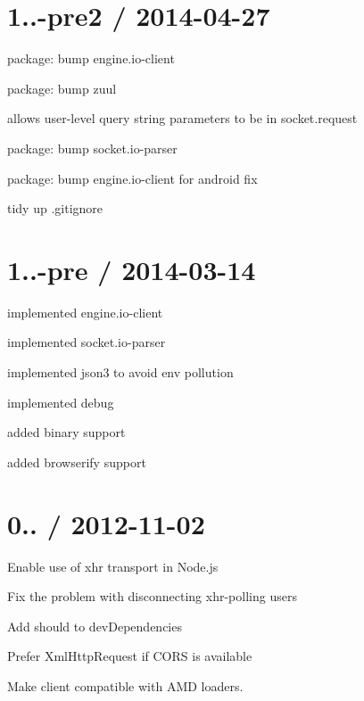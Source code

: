 \section*{1..-\/pre2 / 2014-\/04-\/27 }


\begin{DoxyItemize}
\item package\+: bump {\ttfamily engine.\+io-\/client}
\item package\+: bump {\ttfamily zuul}
\item allows user-\/level query string parameters to be in socket.\+request
\item package\+: bump {\ttfamily socket.\+io-\/parser}
\item package\+: bump {\ttfamily engine.\+io-\/client} for android fix
\item tidy up .gitignore
\end{DoxyItemize}

\section*{1..-\/pre / 2014-\/03-\/14 }


\begin{DoxyItemize}
\item implemented {\ttfamily engine.\+io-\/client}
\item implemented {\ttfamily socket.\+io-\/parser}
\item implemented {\ttfamily json3} to avoid env pollution
\item implemented {\ttfamily debug}
\item added binary support
\item added {\ttfamily browserify} support
\end{DoxyItemize}

\section*{0.. / 2012-\/11-\/02 }


\begin{DoxyItemize}
\item Enable use of \textquotesingle{}xhr\textquotesingle{} transport in Node.\+js
\item Fix the problem with disconnecting xhr-\/polling users
\item Add should to dev\+Dependencies
\item Prefer Xml\+Http\+Request if C\+O\+RS is available
\item Make client compatible with A\+MD loaders.
\end{DoxyItemize}

